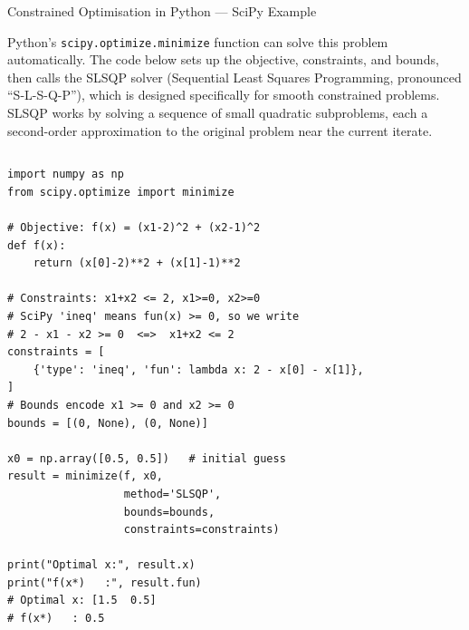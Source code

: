 \documentclass[aspectratio=169,10pt]{beamer}
\begin{document}
\begin{frame}[fragile]{Constrained Optimisation in Python --- SciPy Example}

Python's \texttt{scipy.optimize.minimize} function can solve this problem
automatically.  The code below sets up the objective, constraints, and bounds,
then calls the SLSQP solver (Sequential Least Squares Programming, pronounced
``S-L-S-Q-P''), which is designed specifically for smooth constrained problems.
SLSQP works by solving a sequence of small quadratic subproblems, each a
second-order approximation to the original problem near the current iterate.

  \begin{columns}[T]
      \begin{lstlisting}[style=pycode,caption={Constrained optimization with SciPy}]
import numpy as np
from scipy.optimize import minimize

# Objective: f(x) = (x1-2)^2 + (x2-1)^2
def f(x):
    return (x[0]-2)**2 + (x[1]-1)**2

# Constraints: x1+x2 <= 2, x1>=0, x2>=0
# SciPy 'ineq' means fun(x) >= 0, so we write
# 2 - x1 - x2 >= 0  <=>  x1+x2 <= 2
constraints = [
    {'type': 'ineq', 'fun': lambda x: 2 - x[0] - x[1]},
]
# Bounds encode x1 >= 0 and x2 >= 0
bounds = [(0, None), (0, None)]

x0 = np.array([0.5, 0.5])   # initial guess
result = minimize(f, x0,
                  method='SLSQP',
                  bounds=bounds,
                  constraints=constraints)

print("Optimal x:", result.x)
print("f(x*)   :", result.fun)
# Optimal x: [1.5  0.5]
# f(x*)   : 0.5
      \end{lstlisting}


\end{columns}
\end{frame}
\end{document}
